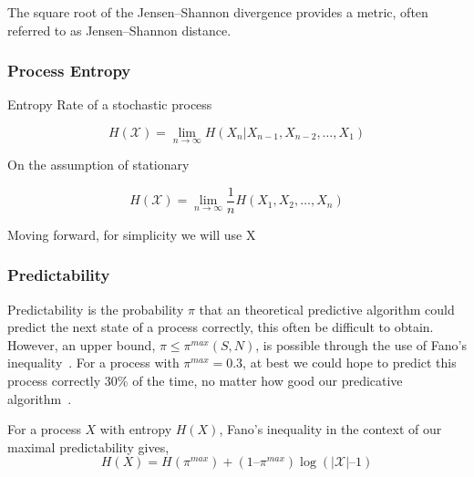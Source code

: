 \begin{remark}
	The square root of the Jensen–Shannon divergence provides a metric, often referred to as Jensen–Shannon distance.
\end{remark}



\subsubsection{Process Entropy}


Entropy Rate of a stochastic process

\begin{equation}\label{eq:entropyrate}
H(\mathcal{X})=\lim _{n \rightarrow \infty} H\left(X_{n} | X_{n-1}, X_{n-2}, \ldots, X_{1}\right)
\end{equation}

On the assumption of stationary

\begin{equation}
H(\mathcal{X})=\lim _{n \rightarrow \infty} \frac{1}{n} H\left(X_{1}, X_{2}, \ldots, X_{n}\right)
\end{equation}

Moving forward, for simplicity we will use X

\subsubsection{Predictability}

Predictability is the probability $\pi$ that an theoretical predictive algorithm could predict the next state of a process correctly, this often be difficult to obtain. However, an upper bound, $\pi \leq \pi^{max}(S,N)$, is possible through the use of Fano's inequality~\cite{fanoTransmissionInformationStatistical1961}. For a process with $\pi^{max} = 0.3$, at best we could hope to predict this process correctly 30\% of the time, no matter how good our predicative algorithm~\cite{songLimitsPredictabilityHuman2010}.

\begin{definition}
For a process $X$ with entropy $H(X)$, Fano's inequality in the context of our maximal predictability gives,
\begin{equation}
H(X) = H(\pi^{max}) + (1 – \pi^{max}) \log (|\mathcal{X}| – 1)
\end{equation}
\end{definition}


